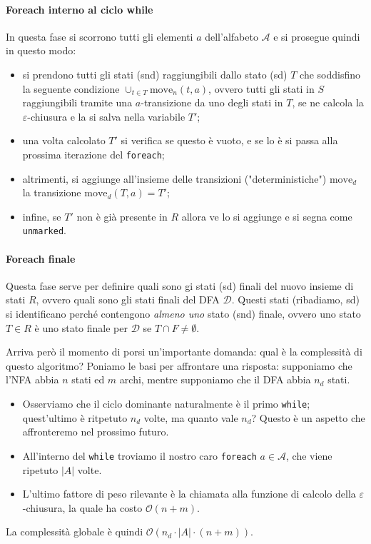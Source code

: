 \documentclass[class=book, crop=false, oneside, 12pt]{standalone}
\begin{document}
\paragraph*{Foreach interno al ciclo while}
In questa fase si scorrono tutti gli elementi \(a\) dell'alfabeto \(\mathcal{A}\) e si prosegue quindi in questo modo:
\begin{itemize}
    \item si prendono tutti gli stati (snd) raggiungibili dallo stato (sd) \(T\) che soddisfino la seguente condizione \(\cup_{t \in T} \textrm{move}_n(t,a)\), ovvero tutti gli stati in \(S\) raggiungibili tramite una \(a\)-transizione da uno degli stati in \(T\), se ne calcola la \(\varepsilon\)-chiusura e la si salva nella variabile \(T'\);
    \item una volta calcolato \(T'\) si verifica se questo è vuoto, e se lo è si passa alla prossima iterazione del \texttt{foreach};
    \item altrimenti, si aggiunge all'insieme delle transizioni ("deterministiche") \(\textrm{move}_d\) la transizione \(\textrm{move}_d(T, a) = T'\);
    \item infine, se \(T'\) non è già presente in \(R\) allora ve lo si aggiunge e si segna come \texttt{unmarked}.
\end{itemize}

\paragraph*{Foreach finale}
Questa fase serve per definire quali sono gi stati (sd) finali del nuovo insieme di stati \(R\), ovvero quali sono gli stati finali del DFA \(\mathcal{D}\). Questi stati (ribadiamo, sd) si identificano perché contengono \emph{almeno uno} stato (snd) finale, ovvero uno stato \(T \in R\) è uno stato finale per \(\mathcal{D}\) se \(T \cap F \neq \emptyset\).

Arriva però il momento di porsi un'importante domanda: qual è la complessità di questo algoritmo?
Poniamo le basi per affrontare una risposta: supponiamo che l’NFA abbia \(n\) stati ed \(m\) archi, mentre supponiamo che il DFA abbia \(n_d\) stati.
\begin{itemize}
    \item Osserviamo che il ciclo dominante naturalmente è il primo \texttt{while}; quest'ultimo  è ritpetuto \(n_d\) volte, ma quanto vale \(n_d\)? Questo è un aspetto che affronteremo nel prossimo futuro.
    \item All'interno del \texttt{while} troviamo il nostro caro \texttt{foreach} \(a \in \mathcal{A}\), che viene ripetuto \(|A|\) volte.
    \item L'ultimo fattore di peso rilevante è la chiamata alla funzione di calcolo della \(\varepsilon\)-chiusura, la quale ha costo \(\mathcal{O}(n+m)\).
\end{itemize}
La complessità globale è quindi \( \mathcal{O}(n_d \cdot |A| \cdot (n+m))\).
\end{document}
